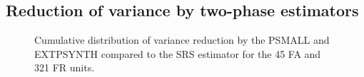 \newpage
\subsection{Reduction of variance by two-phase estimators}
\label{sec:gain_eval}




\begin{figure}[H]
	\centering
	\caption{Cumulative distribution of variance reduction by the PSMALL and EXTPSYNTH compared to the SRS estimator for the  45 FA and 321 FR units.}
	\label{fig:gain}
\end{figure}





\begin{figure}[H]
	\centering
	\caption{}
	\label{fig:fail}
\end{figure}


%
%
%
%
%
%
%








